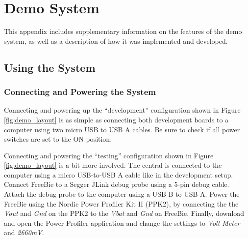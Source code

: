 \chapter{Demo System}
\label{app:appendix_a}
This appendix includes supplementary information on the features of the demo system, as well as a description of how it was implemented and developed.

\section{Using the System}
\subsection{Connecting and Powering the System}
\label{sec:connecting_setup}
Connecting and powering up the ``development'' configuration shown in Figure \ref{fig:demo_layout} is as simple as connecting both development boards to a computer using two micro USB to USB A cables. Be sure to check if all power switches are set to the ON position.

Connecting and powering the ``testing'' configuration shown in Figure \ref{fig:demo_layout} is a bit more involved. The central is connected to the computer using a micro USB-to-USB A cable like in the development setup. Connect FreeBie to a Segger JLink debug probe using a 5-pin debug cable. Attach the debug probe to the computer using a USB B-to-USB A. Power the FreeBie using the Nordic Power Profiler Kit II (PPK2), by connecting the the \textit{Vout} and \textit{Gnd} on the PPK2 to the \textit{Vbat} and \textit{Gnd} on FreeBie. Finally, download and open the Power Profiler application and change the settings to \textit{Volt Meter} and \textit{2660mV}.

